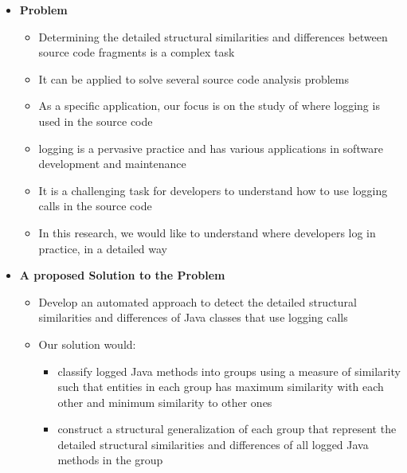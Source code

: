 \documentclass{article}
\newcommand{\bld}{\textbf}
\begin{document}
\begin{itemize} [leftmargin=.1in]
\item \bld{Problem} 
\begin{itemize}
\item Determining the detailed structural similarities and differences between source code fragments is a complex task 
\item It can be applied to solve several source code analysis problems
\item As a specific application, our focus is on the study of where logging is used in the source code 
\item logging is a pervasive practice and has various applications in software development and maintenance
\item It is a challenging task for developers to understand how to use logging calls in the source code 
\item In this research, we would like to understand  where developers log in practice, in a detailed way
\end{itemize}
\item \bld{A proposed Solution to the Problem} 
\begin{itemize}
\item Develop an automated approach to detect the detailed structural similarities and differences of Java classes that use logging calls
\item Our solution would: 
\begin{itemize} [leftmargin=.1in]
\item classify logged Java methods into groups using a measure of similarity such that entities in each group has maximum similarity with each other and minimum similarity to other ones 
\item construct a structural generalization of each group that represent the detailed structural similarities and differences of all logged Java methods in the group
\end{itemize}
\end{itemize}


\end{itemize}
\end{document}
